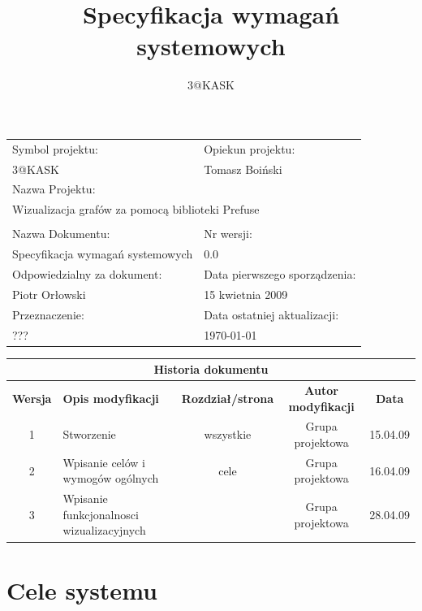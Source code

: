 \documentclass[a4paper,10pt]{article}
\title{Specyfikacja wymagań systemowych}
\author{3@KASK}
\begin{document}



\maketitle


\begin{center}
\begin{tabular}{|p{7cm}|p{7cm}|}
\hline
Symbol projektu: & Opiekun projektu:   \tabularnewline 
3@KASK & Tomasz Boiński    \tabularnewline \hline
\multicolumn{2}{|l|}{Nazwa Projektu: } \tabularnewline
\multicolumn{2}{|l|}{Wizualizacja grafów za pomocą biblioteki Prefuse } \tabularnewline 
\hline
\multicolumn{2}{l}{ } \tabularnewline %
\hline 
Nazwa Dokumentu: & Nr wersji:   \tabularnewline 
Specyfikacja wymagań systemowych & 0.0 \tabularnewline \hline
Odpowiedzialny za dokument: & Data pierwszego sporządzenia:   \tabularnewline 
Piotr Orłowski & 15 kwietnia 2009 \tabularnewline \hline
Przeznaczenie: & Data ostatniej aktualizacji:   \tabularnewline 
??? & \today \tabularnewline \hline
\end{tabular}
\end{center}


\begin{center}
\begin{tabular}{|c|p{4cm}|c|c|c|}
\multicolumn{5}{c}{\textbf{Historia dokumentu}} \tabularnewline \hline
\textbf{Wersja} & \textbf{Opis modyfikacji} & \textbf{Rozdział/strona} & \textbf{Autor modyfikacji} & \textbf{Data} \tabularnewline \hline 
1 & Stworzenie & wszystkie & Grupa projektowa & 15.04.09 \tabularnewline \hline
2 & Wpisanie celów i wymogów ogólnych  & cele & Grupa projektowa & 16.04.09\tabularnewline \hline
3 & Wpisanie funkcjonalnosci wizualizacyjnych & & Grupa projektowa & 28.04.09\tabularnewline \hline
\end{tabular}
 

\end{center}


\newpage
\tableofcontents
\newpage

\section{Cele systemu}

\end{document}
